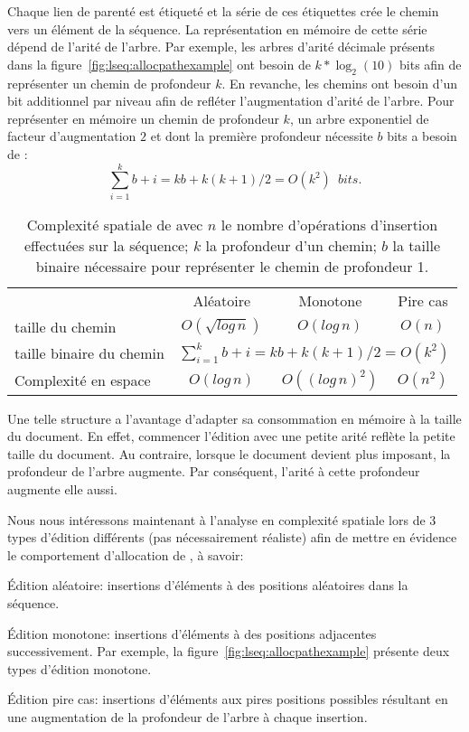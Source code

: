 Chaque lien de parenté est étiqueté et la série de ces étiquettes crée le chemin
vers un élément de la séquence. La représentation en mémoire de cette série
dépend de l'arité de l'arbre. Par exemple, les arbres d'arité décimale présents
dans la figure~\ref{fig:lseq:allocpathexample} ont besoin de $k*\log_2(10)$ bits
afin de représenter un chemin de profondeur $k$.  En revanche, les chemins \LSEQ
ont besoin d'un bit additionnel par niveau afin de refléter l'augmentation
d'arité de l'arbre. Pour représenter en mémoire un chemin de profondeur $k$, un
arbre exponentiel de facteur d'augmentation $2$ et dont la première profondeur
nécessite $b$ bits a besoin de :
\begin{equation}
  \sum\limits_{i=1}^{k}b+i = kb + k(k+1)/2 = O(k^2) \,\,\, bits.
\end{equation}

\begin{table}
  \centering
  \begin{tabular}{@{}lccc@{}}
    \toprule
    & Aléatoire & Monotone & Pire cas \\ \cmidrule{2-4}
    taille du chemin & $O(\sqrt{log\,n})$ & $O(log\,n)$ & $O(n)$ \\ \midrule
    taille binaire du chemin & \multicolumn{3}{c}{ $\sum\limits_{i=1}^{k}b+i =
      kb + k(k+1)/2 = O(k^2)$} \\ \midrule
    Complexité en espace & $O(log\,n)$ & $O((log\,n)^2)$ &
    $O(n^2)$ \\ \bottomrule
  \end{tabular}
  \caption{Complexité spatiale de \LSEQ avec $n$ le nombre d'opérations
    d'insertion effectuées sur la séquence; $k$ la profondeur d'un chemin;
    $b$ la taille binaire nécessaire pour représenter le chemin de profondeur 1.}
\end{table}

Une telle structure a l'avantage d'adapter sa consommation en mémoire à la
taille du document. En effet, commencer l'édition avec une petite arité reflète
la petite taille du document. Au contraire, lorsque le document devient plus
imposant, la profondeur de l'arbre \LSEQ augmente. Par conséquent, l'arité à
cette profondeur augmente elle aussi.

Nous nous intéressons maintenant à l'analyse en complexité spatiale lors de 3
types d'édition différents (pas nécessairement réaliste) afin de mettre en
évidence le comportement d'allocation de \LSEQ, à savoir:
\begin{asparadesc}
\item [Édition aléatoire:] insertions d'éléments à des positions aléatoires dans
  la séquence.
\item [Édition monotone:] insertions d'éléments à des positions adjacentes
  successivement. Par exemple, la figure~\ref{fig:lseq:allocpathexample} présente
  deux types d'édition monotone.
\item [Édition pire cas:] insertions d'éléments aux pires positions possibles
  résultant en une augmentation de la profondeur de l'arbre à chaque insertion.
\end{asparadesc}


